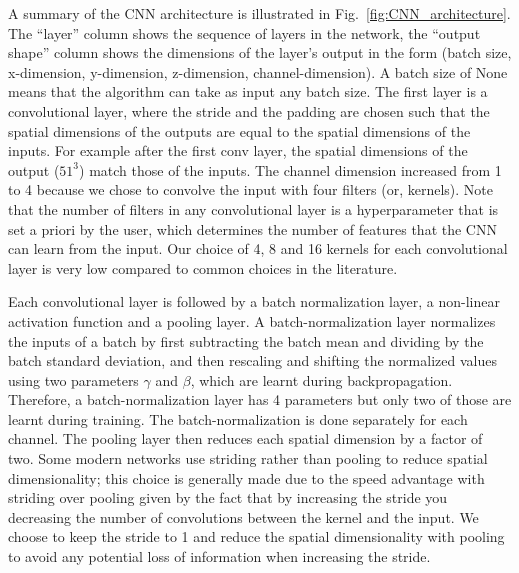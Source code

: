 \documentclass[11pt]{article}
\begin{document}
A summary of the CNN architecture is illustrated in Fig.~\ref{fig:CNN_architecture}. The ``layer'' column shows the sequence of layers in the network, the ``output shape'' column shows the dimensions of the layer's output in the form (batch size, x-dimension, y-dimension, z-dimension, channel-dimension). A batch size of None means that the algorithm can take as input any batch size. The first layer is a convolutional layer, where the stride and the padding are chosen such that the spatial dimensions of the outputs are equal to the spatial dimensions of the inputs. For example after the first conv layer, the spatial dimensions of the output ($51^3$) match those of the inputs. The channel dimension increased from 1 to 4 because we chose to convolve the input with four filters (or, kernels). Note that the number of filters in any convolutional layer is a hyperparameter that is set a priori by the user, which determines the number of features that the CNN can learn from the input. Our choice of 4, 8 and 16 kernels for each convolutional layer is very low compared to common choices in the literature. 

Each convolutional layer is followed by a batch normalization layer, a non-linear activation function and a pooling layer. A batch-normalization layer normalizes the inputs of a batch by first subtracting the batch mean and dividing by the batch standard deviation, and then rescaling and shifting the normalized values using two parameters $\gamma$ and $\beta$, which are learnt during backpropagation. Therefore, a batch-normalization layer has 4 parameters but only two of those are learnt during training. The batch-normalization is done separately for each channel. The pooling layer then reduces each spatial dimension by a factor of two. Some modern networks use striding rather than pooling to reduce spatial dimensionality; this choice is generally made due to the speed advantage with striding over pooling given by the fact that by increasing the stride you decreasing the number of convolutions between the kernel and the input. We choose to keep the stride to 1 and reduce the spatial dimensionality with pooling to avoid any potential loss of information when increasing the stride.
\end{document}
